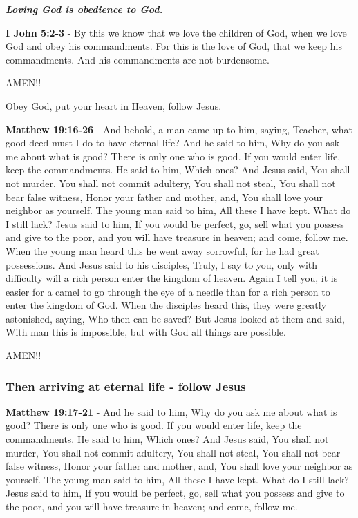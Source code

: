 \documentclass[11pt]{article}
\begin{document}
\emph{\textbf{Loving God is obedience to God.}}

\textbf{I John 5:2-3} - By this we know that we love the children of God, when we love God and obey his commandments. For this is the love of God, that we keep his commandments. And his commandments are not burdensome.

AMEN!!

Obey God, put your heart in Heaven, follow Jesus.

\textbf{Matthew 19:16-26} - And behold, a man came up to him, saying, Teacher, what good deed must I do to have eternal life?  And he said to him, Why do you ask me about what is good? There is only one who is good. If you would enter life, keep the commandments.  He said to him, Which ones? And Jesus said, You shall not murder, You shall not commit adultery, You shall not steal, You shall not bear false witness, Honor your father and mother, and, You shall love your neighbor as yourself.  The young man said to him, All these I have kept. What do I still lack?  Jesus said to him, If you would be perfect, go, sell what you possess and give to the poor, and you will have treasure in heaven; and come, follow me.  When the young man heard this he went away sorrowful, for he had great possessions.  And Jesus said to his disciples, Truly, I say to you, only with difficulty will a rich person enter the kingdom of heaven.  Again I tell you, it is easier for a camel to go through the eye of a needle than for a rich person to enter the kingdom of God.  When the disciples heard this, they were greatly astonished, saying, Who then can be saved?  But Jesus looked at them and said, With man this is impossible, but with God all things are possible.

AMEN!!

\subsubsection{Then arriving at eternal life - follow Jesus}
\label{sec:orge70fa23}
\textbf{Matthew 19:17-21} - And he said to him, Why do you ask me about what is good? There is only one who is good. If you would enter life, keep the commandments.  He said to him, Which ones? And Jesus said, You shall not murder, You shall not commit adultery, You shall not steal, You shall not bear false witness, Honor your father and mother, and, You shall love your neighbor as yourself.  The young man said to him, All these I have kept. What do I still lack?  Jesus said to him, If you would be perfect, go, sell what you possess and give to the poor, and you will have treasure in heaven; and come, follow me.
\end{document}
